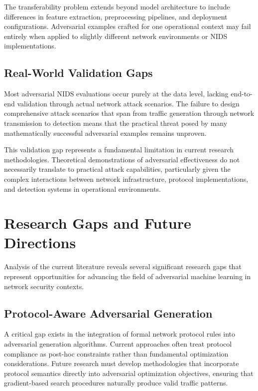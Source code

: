 The transferability problem extends beyond model architecture to include differences in feature extraction, preprocessing pipelines, and deployment configurations. Adversarial examples crafted for one operational context may fail entirely when applied to slightly different network environments or NIDS implementations.

\subsection{Real-World Validation Gaps}

Most adversarial NIDS evaluations occur purely at the data level, lacking end-to-end validation through actual network attack scenarios. The failure to design comprehensive attack scenarios that span from traffic generation through network transmission to detection means that the practical threat posed by many mathematically successful adversarial examples remains unproven.

This validation gap represents a fundamental limitation in current research methodologies. Theoretical demonstrations of adversarial effectiveness do not necessarily translate to practical attack capabilities, particularly given the complex interactions between network infrastructure, protocol implementations, and detection systems in operational environments.

\section{Research Gaps and Future Directions}
\label{sec:research_gaps}

Analysis of the current literature reveals several significant research gaps that represent opportunities for advancing the field of adversarial machine learning in network security contexts.

\subsection{Protocol-Aware Adversarial Generation}

A critical gap exists in the integration of formal network protocol rules into adversarial generation algorithms. Current approaches often treat protocol compliance as post-hoc constraints rather than fundamental optimization considerations. Future research must develop methodologies that incorporate protocol semantics directly into adversarial optimization objectives, ensuring that gradient-based search procedures naturally produce valid traffic patterns.

